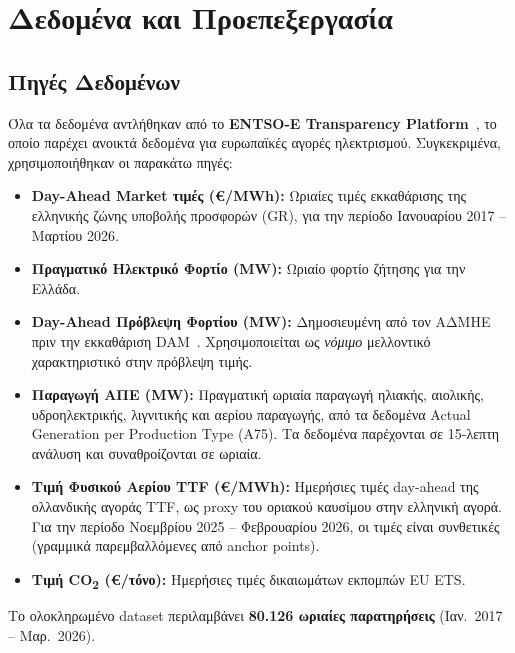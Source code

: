 \chapter{Δεδομένα και Προεπεξεργασία}
\label{ch:data}

\section{Πηγές Δεδομένων}
\label{sec:data_sources}

Όλα τα δεδομένα αντλήθηκαν από το \textbf{ENTSO-E Transparency Platform}~\cite{entsoe_transparency},
το οποίο παρέχει ανοικτά δεδομένα για ευρωπαϊκές αγορές ηλεκτρισμού.
Συγκεκριμένα, χρησιμοποιήθηκαν οι παρακάτω πηγές:

\begin{itemize}
    \item \textbf{Day-Ahead Market τιμές (€/MWh):} Ωριαίες τιμές εκκαθάρισης της ελληνικής ζώνης
    υποβολής προσφορών (GR), για την περίοδο Ιανουαρίου 2017 -- Μαρτίου 2026.

    \item \textbf{Πραγματικό Ηλεκτρικό Φορτίο (MW):} Ωριαίο φορτίο ζήτησης για την Ελλάδα.

    \item \textbf{Day-Ahead Πρόβλεψη Φορτίου (MW):} Δημοσιευμένη από τον ΑΔΜΗΕ πριν την εκκαθάριση
    DAM~\cite{entsoe_load_dayahead}. Χρησιμοποιείται ως \textit{νόμιμο} μελλοντικό χαρακτηριστικό
    στην πρόβλεψη τιμής.

    \item \textbf{Παραγωγή ΑΠΕ (MW):} Πραγματική ωριαία παραγωγή ηλιακής, αιολικής, υδροηλεκτρικής,
    λιγνιτικής και αερίου παραγωγής, από τα δεδομένα Actual Generation per Production Type (A75).
    Τα δεδομένα παρέχονται σε 15-λεπτη ανάλυση και συναθροίζονται σε ωριαία.

    \item \textbf{Τιμή Φυσικού Αερίου TTF (€/MWh):} Ημερήσιες τιμές day-ahead της ολλανδικής αγοράς
    TTF, ως proxy του οριακού καυσίμου στην ελληνική αγορά. Για την περίοδο Νοεμβρίου 2025 --
    Φεβρουαρίου 2026, οι τιμές είναι συνθετικές (γραμμικά παρεμβαλλόμενες από anchor points).

    \item \textbf{Τιμή CO\textsubscript{2} (€/τόνο):} Ημερήσιες τιμές δικαιωμάτων εκπομπών EU ETS.
\end{itemize}

Το ολοκληρωμένο dataset περιλαμβάνει \textbf{80.126 ωριαίες παρατηρήσεις} (Ιαν.\ 2017 -- Μαρ.\ 2026).


